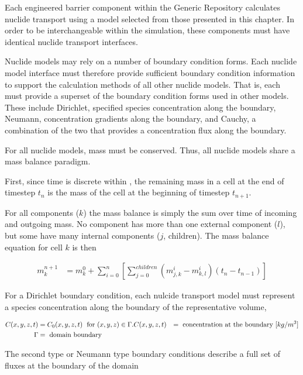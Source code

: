 Each engineered barrier component within the Generic Repository calculates nuclide 
transport using a model selected from those presented in this chapter. In order 
to be interchangeable within the simulation, these components must have 
identical nuclide transport interfaces. 

Nuclide models may rely on a number of boundary condition forms. 
Each nuclide model interface must therefore provide sufficient boundary 
condition information to support the calculation methods of all other nuclide 
models. That is, each must provide a superset of the boundary condition forms 
used in other models. These include Dirichlet, specified species concentration along 
the boundary, Neumann, concentration gradients along the boundary, 
and Cauchy, a combination of the two that provides a concentration flux along the 
boundary.

For all nuclide models, mass must be conserved. Thus, all nuclide models share a 
mass balance paradigm. 

First, since time is discrete within \Cyclus, the remaining mass in a cell at the 
end of timestep $t_n$ is the mass of the cell at the beginning of timestep 
$t_{n+1}$.

For all components ($k$) the mass balance is simply the sum over time of 
incoming and outgoing mass. No component has more than one external component 
($l$), but some have many internal components ($j$, children). The mass balance 
equation for cell $k$ is then

\begin{align}
m_k^{n+1} &= m_k^0 + \sum_{i=0}^n\left[ \sum_{j=0}^{children}\left( 
m_{j,k}^i - m_{k,l}^i\right)(t_n-t_{n-1})\right]
\label{mass_balance}
\end{align}

For a Dirichlet boundary condition, each nulcide transport model must represent 
a species concentration along the boundary of the representative volume, 

\begin{align}
  C(x,y,z,t) &= C_0(x,y,z,t)\hspace{1mm}\mbox{ for } (x,y,z) \in \Gamma.
  C(x,y,z,t) &= \mbox{ concentration at the boundary } [kg/m^3] \nonumber\\
  \Gamma &= \mbox{ domain boundary }\nonumber
\end{align}

The second type or Neumann type boundary conditions describe a full set of 
fluxes at  the boundary of the domain

